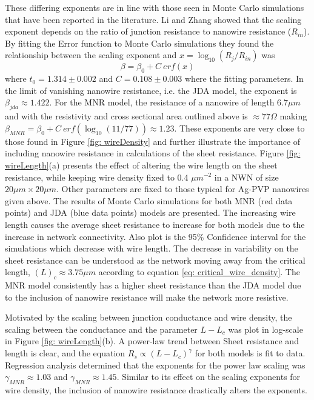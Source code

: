 These differing exponents are in line with those seen in Monte Carlo simulations that have been reported in the literature. Li and Zhang showed that the scaling exponent depends on the ratio of junction resistance to nanowire resistance ($R_{in}$). By fitting the Error function to Monte Carlo simulations they found the relationship between the scaling exponent and $x = \log_{10}(R_j/R_{in})$ was 
\begin{equation}
\beta = \beta_0 + C~ erf(x)
\end{equation}
where $t_0 = 1.314 \pm 0.002$ and $C = 0.108 \pm 0.003$ where the fitting parameters. In the limit of vanishing nanowire resistance, i.e. the JDA model, the exponent is $\beta_{jda} \approx 1.422$. For the MNR model, the resistance of a nanowire of length $6.7 \mu m$ and with the resistivity and cross sectional area outlined above is $\approx 77 \Omega$ making $\beta_{MNR} = \beta_0 + C~erf( \log_{10}(11/77)) \approx 1.23$. These exponents are very close to those found in Figure \ref{fig: wireDensity} and further illustrate the importance of including nanowire resistance in calculations of the sheet resistance. 
Figure \ref{fig: wireLength}(a) presents the effect of altering the wire length on the sheet resistance, while keeping wire density fixed to 0.4 $\mu m^{-2}$ in a NWN of size $20 \mu m \times 20 \mu m$. Other parameters are fixed to those typical for Ag-PVP nanowires given above. The results of Monte Carlo simulations for both MNR (red data points) and JDA (blue data points) models are presented. The increasing wire length causes the average sheet resistance to increase for both models due to the increase in network connectivity. Also plot is the 95\% Confidence interval for the simulations which decrease with wire length. The decrease in variability on the sheet resistance can be understood as the network moving away from the critical length, $(L)_c \approx 3.75 \mu m$ according to equation \ref{eq: critical_wire_density}. The MNR model consistently has a higher sheet resistance than the JDA model due to the inclusion of nanowire resistance will make the network more resistive. 

Motivated by the scaling between junction conductance and wire density, the scaling between the conductance and the parameter $L - L_c$ was plot in log-scale in Figure \ref{fig: wireLength}(b). A power-law trend between Sheet resistance and length is clear, and the equation $R_s\propto(L-L_c)^{\gamma}$ for both models is fit to data. Regression analysis determined that the exponents for the power law scaling was $\gamma_{MNR} \approx 1.03$ and $\gamma_{MNR} \approx 1.45$. Similar to its effect on the scaling exponents for wire density, the inclusion of nanowire resistance drastically alters the exponents.

